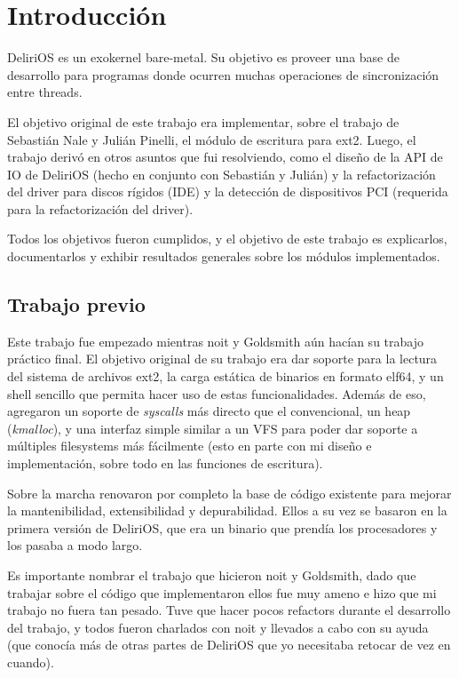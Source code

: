 
\chapter*{Introducción}
DeliriOS es un exokernel bare-metal. Su objetivo es proveer una base de desarrollo para programas donde ocurren muchas operaciones de sincronización entre threads.

El objetivo original de este trabajo era implementar, sobre el trabajo de Sebastián Nale y Julián Pinelli, el módulo de escritura para ext2.
Luego, el trabajo derivó en otros asuntos que fui resolviendo, como el diseño de la API de IO de DeliriOS (hecho en conjunto con Sebastián y Julián) y la refactorización del driver para discos rígidos (IDE) y la detección de dispositivos PCI (requerida para la refactorización del driver).

Todos los objetivos fueron cumplidos, y el objetivo de este trabajo es explicarlos, documentarlos y exhibir resultados generales sobre los módulos implementados.
\newpage

\section*{Trabajo previo}

Este trabajo fue empezado mientras noit y Goldsmith aún hacían su trabajo práctico final. El objetivo original de su trabajo era dar soporte para la lectura del sistema de archivos ext2, la carga estática de binarios en formato elf64, y un shell sencillo que permita hacer uso de estas funcionalidades. Además de eso, agregaron un soporte de \textit{syscalls} más directo que el convencional, un heap (\emph{kmalloc}), y una interfaz simple similar a un VFS para poder dar soporte a múltiples filesystems más fácilmente (esto en parte con mi diseño e implementación, sobre todo en las funciones de escritura).

Sobre la marcha renovaron por completo la base de código existente para mejorar la mantenibilidad, extensibilidad y depurabilidad. Ellos a su vez se basaron en la primera versión de DeliriOS, que era un binario que prendía los procesadores y los pasaba a modo largo.

Es importante nombrar el trabajo que hicieron noit y Goldsmith, dado que trabajar sobre el código que implementaron ellos fue muy ameno e hizo que mi trabajo no fuera tan pesado. Tuve que hacer pocos refactors durante el desarrollo del trabajo, y todos fueron charlados con noit y llevados a cabo con su ayuda (que conocía más de otras partes de DeliriOS que yo necesitaba retocar de vez en cuando).




